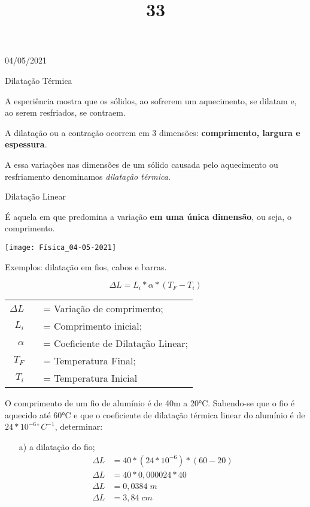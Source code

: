 \documentclass{SchoolBook}
\begin{document}
    \begin{day}{04/05/2021}
        \title{3}{Dilatação Térmica}
        
        A esperiência mostra que os sólidos, ao sofrerem um aquecimento, se dilatam e, ao serem resfriados, se contraem.
        
        A dilatação ou a contração ocorrem em 3 dimensões: \textbf{comprimento, largura e espessura}.
        
        A essa variações nas dimensões de um sólido causada pelo aquecimento ou resfriamento denominamos \emph{dilatação térmica}. 
        
        \title{3}{Dilatação Linear}
        
        É aquela em que predomina a variação \textbf{em uma única dimensão}, ou seja, o comprimento.
        
        \begin{center}
            \texttt{[image: Física\_04-05-2021]}
        \end{center}
        
        Exemplos: dilatação em fios, cabos e barras.
        
        $$ \Delta L = L_i * \alpha * ( T_F - T_i ) $$
        
        \vspace{6pt}
        \begin{tabular}{ r c l }
            $ \Delta L $ &&= Variação de comprimento;         \\
                 $ L_i $ &&= Comprimento inicial;             \\
              $ \alpha $ &&= Coeficiente de Dilatação Linear; \\
                 $ T_F $ &&= Temperatura Final;               \\
                 $ T_i $ &&= Temperatura Inicial
        \end{tabular}
        
        \vspace{6pt}
        
        O comprimento de um fio de alumínio é de 40m a 20°C. Sabendo-se que o fio é aquecido até 60°C e que o coeficiente de dilatação térmica linear do alumínio é de $24 * 10^{-6\circ} C^{-1}$, determinar:
        
        \begin{enumerate}
            \item[a)] a dilatação do fio;
            \begin{align*}
                \Delta L &= 40 * (24 * 10^{-6}) * (60 - 20) \\
                \Delta L &= 40 * 0,000024 * 40              \\
                \Delta L &= 0,0384\;m                       \\
                \Delta L &= 3,84\;cm            
            \end{align*}
            

\end{enumerate}
\end{day}
\end{document}
